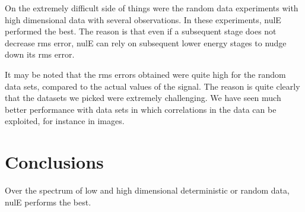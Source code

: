 On the extremely difficult side of things were the random data experiments with high dimensional data with several observations.  In these experiments, nulE performed the best.  The reason is that even if a subsequent stage does not decrease rms error, nulE can rely on subsequent lower energy stages to nudge down its rms error.  


It may be noted that the rms errors obtained were quite high for the random data sets, compared to the actual values of the signal.  The reason is quite clearly that the datasets we picked were extremely challenging.  We have seen much better performance with data sets in which correlations in the data can be exploited, for instance in images.

\section{Conclusions}
Over the spectrum of low and high dimensional deterministic or random data, nulE performs the best.





\clearpage
\newpage
